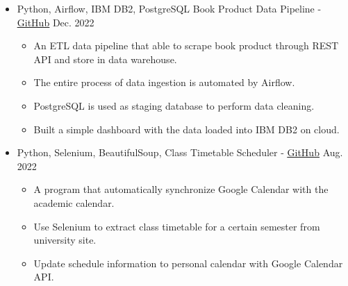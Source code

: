 \documentclass[11pt,a4paper,sans]{moderncv}        %
\begin{document}
\begin{itemize}

\item{
\cventry
{}
{Python, Airflow, IBM DB2, PostgreSQL}
{Book Product Data Pipeline - \href{https://github.com/locnd-172/book-product-data-pipeline-project}{\underline{\normalfont GitHub}}}
{Dec. 2022}
{}
{\vspace{1pt}
\begin{itemize}
\item  An ETL data pipeline that able to scrape book product through REST API and store in data warehouse.
\vspace{1pt}
\item  The entire process of data ingestion is automated by Airflow.
\vspace{1pt}
\item  PostgreSQL is used as staging database to perform data cleaning.
\vspace{1pt}
\item  Built a simple dashboard with the data loaded into IBM DB2 on cloud.
\end{itemize}
}}

\vspace{1.5pt}

\item{
\cventry
{}
{Python, Selenium, BeautifulSoup, }
{Class Timetable Scheduler - \href{https://github.com/locnd-172/Automate-updating-GCal-with-university-timetable}{\underline{\normalfont GitHub}}}
{Aug. 2022}
{}
{\vspace{1pt}
\begin{itemize}
\item  A program that automatically synchronize Google Calendar with the academic calendar.
\vspace{1pt}
\item  Use Selenium to extract class timetable for a certain semester from university site.
\vspace{1pt}
\item  Update schedule information to personal calendar with Google Calendar API.
\end{itemize}
}}

\vspace{1.5pt}


\end{itemize}
\end{document}

